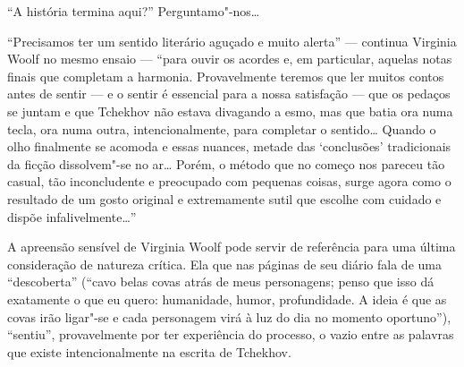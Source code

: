 ``A história termina aqui?'' Perguntamo"-nos\ldots{}

``Precisamos ter um sentido
literário aguçado e muito alerta'' --- continua Virginia Woolf no mesmo ensaio --- ``para
ouvir os acordes e, em particular, aquelas notas finais que completam a
harmonia. Provavelmente teremos que ler muitos contos antes de sentir ---
e o sentir é essencial para a nossa satisfação --- que os pedaços se
juntam e que Tchekhov não estava divagando a esmo, mas que batia ora
numa tecla, ora numa outra, intencionalmente, para completar o
sentido\ldots{} Quando o olho finalmente se acomoda e essas nuances, metade
das `conclusões' tradicionais da ficção dissolvem"-se no ar\ldots{} Porém, o
método que no começo nos pareceu tão casual, tão inconcludente e
preocupado com pequenas coisas, surge agora como o resultado de um gosto
original e extremamente sutil que escolhe com cuidado e dispõe
infalivelmente\ldots{}''

A apreensão sensível de Virginia Woolf pode servir de referência para
uma última consideração de natureza crítica. Ela que nas páginas de seu
diário fala de uma ``descoberta'' (``cavo belas covas atrás de meus
personagens; penso que isso dá exatamente o que eu quero: humanidade,
humor, profundidade. A ideia é que as covas irão ligar"-se e cada
personagem virá à luz do dia no momento oportuno''), ``sentiu'',
provavelmente por ter experiência do processo, o vazio entre as palavras
que existe intencionalmente na escrita de Tchekhov.

